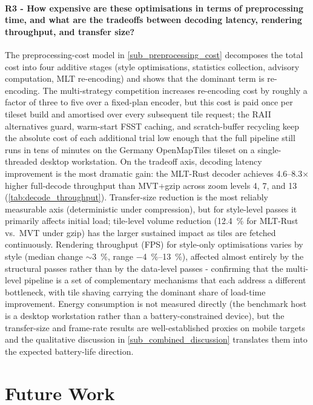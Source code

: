 \paragraph{R3 - How expensive are these optimisations in terms of preprocessing time, and what are the tradeoffs between decoding latency, rendering throughput, and transfer size?}
The preprocessing-cost model in \cref{sub_preprocessing_cost} decomposes the total cost into four additive stages (style optimisations, statistics collection, advisory computation, \ac{MLT} re-encoding) and shows that the dominant term is re-encoding.
The multi-strategy competition increases re-encoding cost by roughly a factor of three to five over a fixed-plan encoder, but this cost is paid once per tileset build and amortised over every subsequent tile request; the \ac{RAII} alternatives guard, warm-start \ac{FSST} caching, and scratch-buffer recycling keep the absolute cost of each additional trial low enough that the full pipeline still runs in tens of minutes on the Germany OpenMapTiles tileset on a single-threaded desktop workstation.
On the tradeoff axis, decoding latency improvement is the most dramatic gain: the \ac{MLT}-Rust decoder achieves \numrange{4.6}{8.3}$\times$ higher full-decode throughput than \ac{MVT}+gzip across zoom levels 4, 7, and 13 (\cref{tab:decode_throughput}).
Transfer-size reduction is the most reliably measurable axis (deterministic under compression), but for style-level passes it primarily affects initial load; tile-level volume reduction (\qty{12.4}{\percent} for \ac{MLT}-Rust vs.\ \ac{MVT} under gzip) has the larger sustained impact as tiles are fetched continuously.
Rendering throughput (FPS) for style-only optimisations varies by style (median change ${\sim}$\qty{3}{\percent}, range \qtyrange{-4}{13}{\percent}), affected almost entirely by the structural passes rather than by the data-level passes - confirming that the multi-level pipeline is a set of complementary mechanisms that each address a different bottleneck, with tile shaving carrying the dominant share of load-time improvement.
Energy consumption is not measured directly (the benchmark host is a desktop workstation rather than a battery-constrained device), but the transfer-size and frame-rate results are well-established proxies on mobile targets and the qualitative discussion in \cref{sub_combined_discussion} translates them into the expected battery-life direction.

\section{Future Work}\label{sec_conclusion_future_work}

